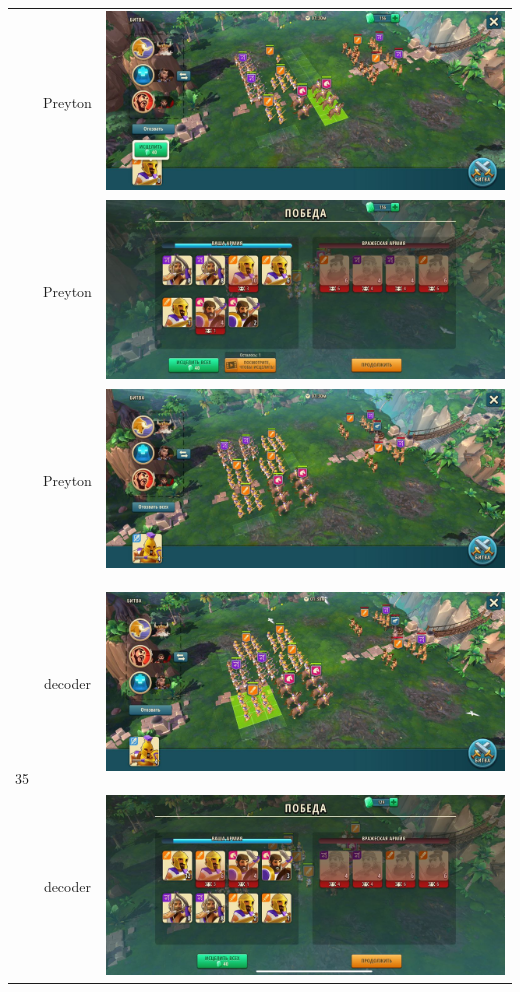 \begin{longtable}{|c|c|c|}
	& Preyton &
	\includegraphics[width=0.75\linewidth]{./parts/media/TreasureHunt/35/Preyton/35.2.jpg} \\
	& Preyton &
	\includegraphics[width=0.75\linewidth]{./parts/media/TreasureHunt/35/Preyton/35_2.jpg} \\
	& Preyton &
	\includegraphics[width=0.75\linewidth]{./parts/media/TreasureHunt/35/Preyton/35.1.jpg} \\
	\hline
	\multirow{12}{*}{35} & decoder &
	\hypertarget{fight35}{\includegraphics[width=0.75\linewidth]{./parts/media/TreasureHunt/35/decoder/photo_2022-04-07_10-05-55.jpg}} \\
	& decoder &
	\includegraphics[width=0.75\linewidth]{./parts/media/TreasureHunt/35/decoder/photo_2022-04-07_10-06-14.jpg} \\

\end{longtable}
